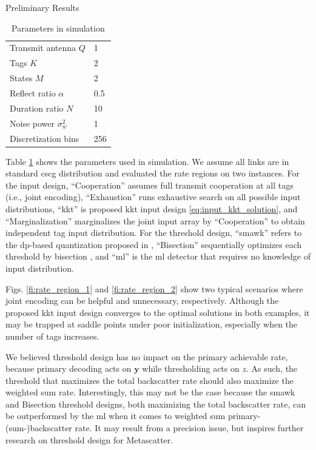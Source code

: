 \documentclass[journal]{IEEEtran}
\begin{document}
\begin{section}{Preliminary Results}
	\begin{table}[t!]
		\centering
		\caption{Parameters in simulation}
		\begin{tabular}{ll}
			Transmit antenna $Q$     & 1   \\
			Tags $K$                 & 2   \\
			States $M$               & 2   \\
			Reflect ratio $\alpha$   & 0.5 \\
			Duration ratio $N$       & 10  \\
			Noise power $\sigma_w^2$ & 1   \\
			Discretization bins      & 256
		\end{tabular}
		\label{ta:parameters}
	\end{table}
	Table \ref{ta:parameters} shows the parameters used in simulation.
	We assume all links are in standard \gls{cscg} distribution and evaluated the rate regions on two instances.
	For the input design, ``Cooperation'' assumes full transmit cooperation at all tags (i.e., joint encoding), ``Exhaustion'' runs exhaustive search on all possible input distributions, ``\gls{kkt}'' is proposed \gls{kkt} input design \eqref{eq:input_kkt_solution}, and ``Marginalization'' marginalizes the joint input array by ``Cooperation'' to obtain independent tag input distribution.
	For the threshold design, ``\gls{smawk}'' refers to the \gls{dp}-based quantization proposed in \cite{He2021}, ``Bisection'' sequentially optimizes each threshold by bisection \cite{Nguyen2020a}, and ``\gls{ml}'' is the \gls{ml} detector that requires no knowledge of input distribution.

	Figs. \ref{fi:rate_region_1} and \ref{fi:rate_region_2} show two typical scenarios where joint encoding can be helpful and unnecessary, respectively.
	Although the proposed \gls{kkt} input design converges to the optimal solutions in both examples, it may be trapped at saddle points under poor initialization, especially when the number of tags increases.

	We believed threshold design has no impact on the primary achievable rate, because primary decoding acts on $\boldsymbol{y}$ while thresholding acts on $z$.
	As such, the threshold that maximizes the total backscatter rate should also maximize the weighted sum rate.
	Interestingly, this may not be the case because the \gls{smawk} and Bisection threshold designs, both maximizing the total backscatter rate, can be outperformed by the \gls{ml} when it comes to weighted sum primary-(sum-)backscatter rate.
	It may result from a precision issue, but inspires further research on threshold design for Metascatter.


\end{section}
\end{document}

